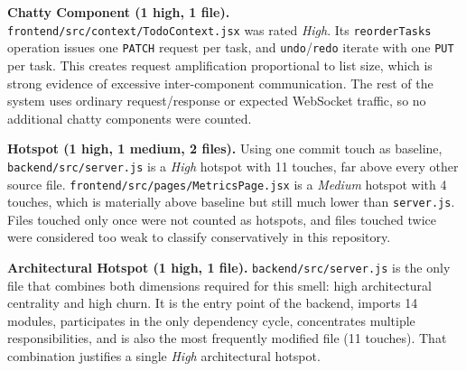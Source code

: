 \textbf{Chatty Component (1 high, 1 file).} \texttt{frontend/src/context/TodoContext.jsx} was rated \emph{High}. Its \texttt{reorderTasks} operation issues one \texttt{PATCH} request per task, and \texttt{undo}/\texttt{redo} iterate with one \texttt{PUT} per task. This creates request amplification proportional to list size, which is strong evidence of excessive inter-component communication. The rest of the system uses ordinary request/response or expected WebSocket traffic, so no additional chatty components were counted.

\textbf{Hotspot (1 high, 1 medium, 2 files).} Using one commit touch as baseline, \texttt{backend/src/server.js} is a \emph{High} hotspot with 11 touches, far above every other source file. \texttt{frontend/src/pages/MetricsPage.jsx} is a \emph{Medium} hotspot with 4 touches, which is materially above baseline but still much lower than \texttt{server.js}. Files touched only once were not counted as hotspots, and files touched twice were considered too weak to classify conservatively in this repository.

\textbf{Architectural Hotspot (1 high, 1 file).} \texttt{backend/src/server.js} is the only file that combines both dimensions required for this smell: high architectural centrality and high churn. It is the entry point of the backend, imports 14 modules, participates in the only dependency cycle, concentrates multiple responsibilities, and is also the most frequently modified file (11 touches). That combination justifies a single \emph{High} architectural hotspot.
